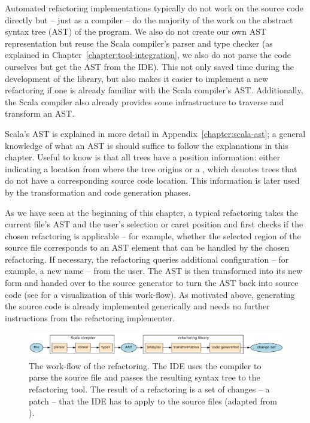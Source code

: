 Automated refactoring implementations typically do not work on the source code directly but -- just as a compiler -- do the majority of the work on the abstract syntax tree (AST) of the program. We also do not create our own AST representation but reuse the Scala compiler's parser and type checker (as explained in Chapter~\ref{chapter:tool-integration}, we also do not parse the code ourselves but get the AST from the IDE). This not only saved time during the development of the library, but also makes it easier to implement a new refactoring if one is already familiar with the Scala compiler's AST. Additionally, the Scala compiler also already provides some infrastructure to traverse and transform an AST.


Scala's AST is explained in more detail in Appendix~\vref{chapter:scala-ast}; a general knowledge of what an AST is should suffice to follow the explanations in this chapter. Useful to know is that all trees have a position information: either indicating a location from where the tree origins or a , which denotes trees that do not have a corresponding source code location. This information is later used by the transformation and code generation phases.

As we have seen at the beginning of this chapter, a typical refactoring takes the current file's AST and the user's selection or caret position and first checks if the chosen refactoring is applicable -- for example, whether the selected region of the source file corresponds to an AST element that can be handled by the chosen refactoring. If necessary, the refactoring queries additional configuration -- for example, a new name -- from the user. The AST is then transformed into its new form and handed over to the source generator to turn the AST back into source code (see  for a visualization of this work-flow). As motivated above, generating the source code is already implemented generically and needs no further instructions from the refactoring implementer. %

\begin{figure}
  \centering
  \includegraphics[width=\linewidth]{refactoring-flow.pdf}
  \caption{The work-flow of the refactoring. The IDE uses the compiler to parse the source file and passes the resulting syntax tree to the refactoring tool. The result of a refactoring is a set of changes -- a patch -- that the IDE has to apply to the source files (adapted from \cite{ScalaRefactoring}).}
  \label{figure:refactoring-flow}
\end{figure}

